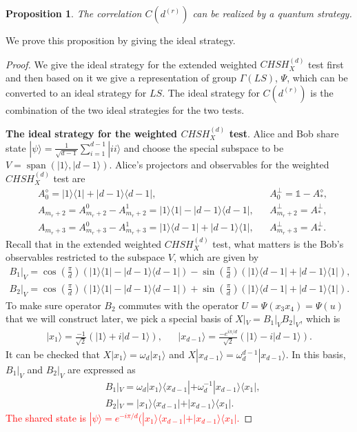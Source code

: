 \documentclass[11pt,letterpaper]{article}
\newcommand{\ket}[1]{|#1\rangle}
\newcommand{\ketbra}[2]{|#1\rangle\langle#2|}
\DeclareMathOperator{\spn}{span}
\newcommand{\1}{\mathbb{1}}
\newcommand{\CHSH}{CHSH^{(d)}}
\newcommand{\LS}{LS}
\newcommand{\dr}[1]{d^{(#1)}}
\newtheorem{proposition}[theorem]{Proposition}
\theoremstyle{definition}
\begin{document}
\begin{proposition}
	\label{prop:realize}
	The correlation $C(\dr{r})$ can be realized by a quantum strategy.
\end{proposition}
We prove this proposition by giving the ideal strategy.
\begin{proof}
We give the ideal strategy for the extended weighted $\CHSH_X$ test first and then based on it we give a representation of 
group $\Gamma(\LS)$, $\Psi$, which can be converted to an ideal strategy for $\LS$. 
The ideal strategy for $C(\dr{r})$ is the combination of the two ideal strategies for the two tests.

\textbf{The ideal strategy for the weighted $\CHSH_X$ test}.
Alice and Bob share state $\ket{\psi} = \frac{1}{\sqrt{d-1}}\sum_{i=1}^{d-1} \ket{ii}$ and choose the special subspace to be 
$V = \spn(\ket{1} ,\ket{d-1})$.
Alice's projectors and observables for the weighted $\CHSH_X$ test are
\begin{align*}
	&A_0^\diamond = \ketbra{1}{1} + \ketbra{d-1}{d-1}, &&A_0^\perp = \1 - A_\ast^\diamond, \\
	&A_{m_r+2} = A_{m_r+2}^0-A_{m_r+2}^1 = \ketbra{1}{1} - \ketbra{d-1}{d-1}, &&A_{m_r+2}^\perp = A_\ast^\perp,\\
	&A_{m_r+3} = A_{m_r+3}^0-A_{m_r+3}^1 = \ketbra{1}{d-1} + \ketbra{d-1}{1} ,&&A_{m_r+3}^\perp = A_\ast^\perp.
\end{align*}
Recall that in the extended weighted $\CHSH_X$ test, what matters is the 
Bob's observables restricted to the subspace $V$, which are given by
\begin{align*}
	B_1|_V = \cos(\frac{\pi}{d})(\ketbra{1}{1} - \ketbra{d-1}{d-1}) - \sin(\frac{\pi}{d})(\ketbra{1}{d-1} + \ketbra{d-1}{1}),\\
	B_2|_V = \cos(\frac{\pi}{d})(\ketbra{1}{1} - \ketbra{d-1}{d-1}) +\sin(\frac{\pi}{d})(\ketbra{1}{d-1} + \ketbra{d-1}{1}).
\end{align*}
To make sure operator $B_2$ commutes with the operator $U = \Psi(x_3x_4) = \Psi(u)$ that we will construct later, we pick a 
special basis of $X|_V =B_1|_VB_2|_V$, which is
\begin{align}
	\ket{x_1} = \frac{-1}{\sqrt{2}}(\ket{1} + i\ket{d-1}), &&
	\ket{x_{d-1}} = \frac{-e^{i\pi/d}}{\sqrt{2}}(\ket{1} - i\ket{d-1}).
\end{align}
It can be checked that $X\ket{x_1} = \omega_d \ket{x_1}$ and $X\ket{x_{d-1}} = \omega_d^{d-1} \ket{x_{d-1}}$.
In this basis, $B_1|_V$ and $B_2|_V$ are expressed as 
\begin{align}
	&B_1|_V = \omega_d\ketbra{x_1}{x_{d-1}} + \omega_d^{-1} \ketbra{x_{d-1}}{x_1},\\
	&B_2|_V =\ketbra{x_1}{x_{d-1}}  + \ketbra{x_{d-1}}{x_1}.
\end{align}
\textcolor{red}{The shared state is $\ket{\psi} = e^{-i\pi/d} (\ketbra{x_1}{x_{d-1}} + \ketbra{x_{d-1}}{x_1}$.}


\end{proof}
\end{document}
